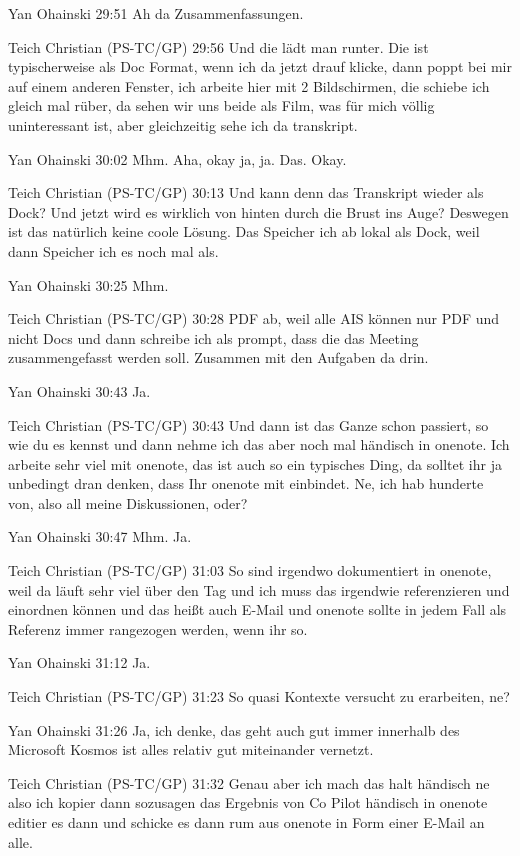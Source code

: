 Yan Ohainski   29:51
Ah da Zusammenfassungen.

Teich Christian (PS-TC/GP)   29:56
Und die lädt man runter. Die ist typischerweise als Doc Format, wenn ich da jetzt drauf klicke, dann poppt bei mir auf einem anderen Fenster, ich arbeite hier mit 2 Bildschirmen, die schiebe ich gleich mal rüber, da sehen wir uns beide als Film, was für mich völlig uninteressant ist, aber gleichzeitig sehe ich da transkript.

Yan Ohainski   30:02
Mhm.
Aha, okay ja, ja. Das.
Okay.

Teich Christian (PS-TC/GP)   30:13
Und kann denn das Transkript wieder als Dock? Und jetzt wird es wirklich von hinten durch die Brust ins Auge? Deswegen ist das natürlich keine coole Lösung. Das Speicher ich ab lokal als Dock, weil dann Speicher ich es noch mal als.

Yan Ohainski   30:25
Mhm.

Teich Christian (PS-TC/GP)   30:28
PDF ab, weil alle AIS können nur PDF und nicht Docs und dann schreibe ich als prompt, dass die das Meeting zusammengefasst werden soll. Zusammen mit den Aufgaben da drin.

Yan Ohainski   30:43
Ja.

Teich Christian (PS-TC/GP)   30:43
Und dann ist das Ganze schon passiert, so wie du es kennst und dann nehme ich das aber noch mal händisch in onenote. Ich arbeite sehr viel mit onenote, das ist auch so ein typisches Ding, da solltet ihr ja unbedingt dran denken, dass Ihr onenote mit einbindet. Ne, ich hab hunderte von, also all meine Diskussionen, oder?

Yan Ohainski   30:47
Mhm.
Ja.

Teich Christian (PS-TC/GP)   31:03
So sind irgendwo dokumentiert in onenote, weil da läuft sehr viel über den Tag und ich muss das irgendwie referenzieren und einordnen können und das heißt auch E-Mail und onenote sollte in jedem Fall als Referenz immer rangezogen werden, wenn ihr so.

Yan Ohainski   31:12
Ja.

Teich Christian (PS-TC/GP)   31:23
So quasi Kontexte versucht zu erarbeiten, ne?

Yan Ohainski   31:26
Ja, ich denke, das geht auch gut immer innerhalb des Microsoft Kosmos ist alles relativ gut miteinander vernetzt.

Teich Christian (PS-TC/GP)   31:32
Genau aber ich mach das halt händisch ne also ich kopier dann sozusagen das Ergebnis von Co Pilot händisch in onenote editier es dann und schicke es dann rum aus onenote in Form einer E-Mail an alle.

